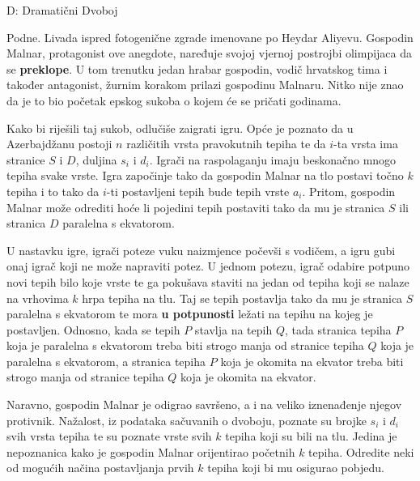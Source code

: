 

\begin{statement}[
  timelimit=1 s,
  memorylimit=512 MiB,
]{D: Dramatični Dvoboj}

Podne. Livada ispred fotogenične zgrade imenovane po Heydar Aliyevu. Gospodin
Malnar, protagonist ove anegdote, naređuje svojoj vjernoj postrojbi olimpijaca
da se \textbf{preklope}. U tom trenutku jedan hrabar gospodin, vodič hrvatskog
tima i također antagonist, žurnim korakom prilazi gospodinu Malnaru. Nitko nije
znao da je to bio početak epskog sukoba o kojem će se pričati godinama.

Kako bi riješili taj sukob, odlučiše zaigrati igru. Opće je poznato da u
Azerbajdžanu postoji $n$ različitih vrsta pravokutnih tepiha te da $i$-ta vrsta
ima stranice $S$ i $D$, duljina $s_i$ i $d_i$. Igrači na raspolaganju imaju
beskonačno mnogo tepiha svake vrste. Igra započinje tako da gospodin Malnar
na tlo postavi točno $k$ tepiha i to tako da $i$-ti postavljeni tepih bude
tepih vrste $a_i$. Pritom, gospodin Malnar može odrediti hoće li pojedini tepih
postaviti tako da mu je stranica $S$ ili stranica $D$ paralelna s ekvatorom.

U nastavku igre, igrači poteze vuku naizmjence počevši s vodičem, a igru gubi
onaj igrač koji ne može napraviti potez. U jednom potezu, igrač odabire potpuno
novi tepih bilo koje vrste te ga pokušava staviti na jedan od tepiha koji se
nalaze na vrhovima $k$ hrpa tepiha na tlu. Taj se tepih postavlja tako da mu
je stranica $S$ paralelna s ekvatorom te mora \textbf{u potpunosti} ležati na
tepihu na kojeg je postavljen. Odnosno, kada se tepih $P$ stavlja na tepih $Q$,
tada stranica tepiha $P$ koja je paralelna s ekvatorom treba biti strogo manja
od stranice tepiha $Q$ koja je paralelna s ekvatorom, a stranica tepiha $P$
koja je okomita na ekvator treba biti strogo manja od stranice tepiha $Q$ koja
je okomita na ekvator.

Naravno, gospodin Malnar je odigrao savršeno, a i na veliko iznenađenje njegov
protivnik. Nažalost, iz podataka sačuvanih o dvoboju, poznate su brojke $s_i$ i
$d_i$ svih vrsta tepiha te su poznate vrste svih $k$ tepiha koji su bili na tlu.
Jedina je nepoznanica kako je gospodin Malnar orijentirao početnih $k$ tepiha.
Odredite neki od mogućih načina postavljanja prvih $k$ tepiha koji bi mu osigurao
pobjedu.


\end{statement}
